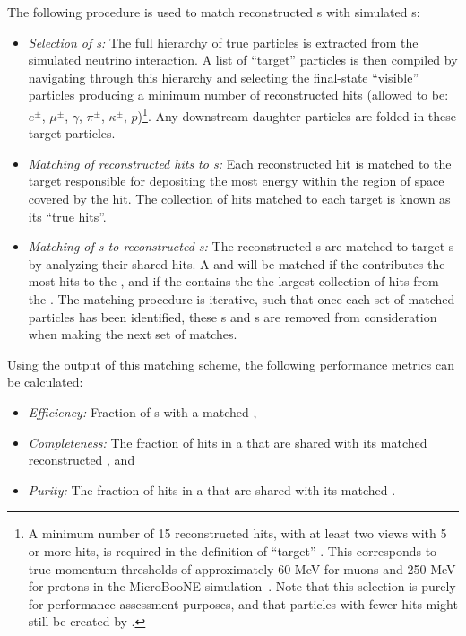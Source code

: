 The following procedure is used to match reconstructed s with simulated s:

\begin{itemize}
\item \textit{Selection of s:} The full hierarchy of true particles is extracted from the simulated neutrino interaction. A list of ``target'' particles is then compiled by navigating through this hierarchy and selecting the final-state ``visible'' particles producing a minimum number of reconstructed hits (allowed to be: $e^{\pm}$, $\mu^{\pm}$, $\gamma$, $\pi^{\pm}$, $\kappa^{\pm}$, $p$)\footnote{A minimum number of 15 reconstructed hits, with at least two views with 5 or more hits, is required in the definition of ``target'' . This  corresponds to true momentum thresholds of approximately 60 MeV for muons and 250 MeV for protons in the MicroBooNE simulation~\cite{Acciarri:2017hat}. Note that this selection is purely for performance assessment purposes, and that particles with fewer hits might still be created by .}. Any downstream daughter particles are folded in these target particles.
\item \textit{Matching of reconstructed \twod hits to s:} Each reconstructed \twod hit is matched to the target  responsible for depositing the most energy within the region of space covered by the hit. The collection of \twod hits matched to each target  is known as its ``true hits''.
\item \textit{Matching of s to reconstructed s:} The reconstructed s are matched to target s by analyzing their shared \twod hits. A  and  will be matched if the  contributes the most hits to the , and if the  contains the the largest collection of hits from the . The matching procedure is iterative, such that once each set of matched particles has been identified, these s and s are removed from consideration when making the next set of matches. 
\end{itemize}

Using the output of this matching scheme, the following performance metrics can be calculated:

\begin{itemize}
\item \textit{Efficiency:} Fraction of s with a matched ,
\item \textit{Completeness:} The fraction of \twod hits in a  that are shared with its matched reconstructed , and 
\item \textit{Purity:} The fraction of \twod hits in a  that are shared with its matched .
\end{itemize}

